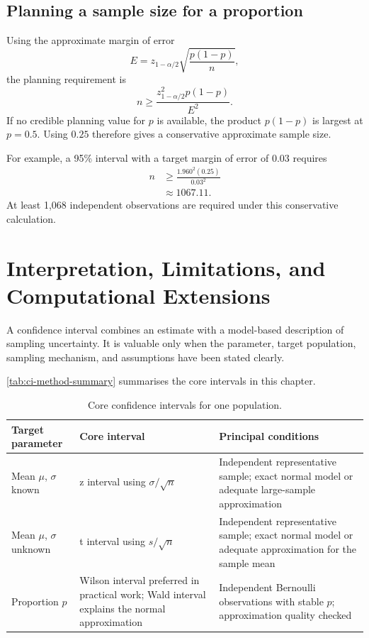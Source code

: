 \subsection{Planning a sample size for a proportion}

Using the approximate margin of error
\[
    E=z_{1-\alpha/2}
      \sqrt{\frac{p(1-p)}{n}},
\]
the planning requirement is
\[
    n\geq
    \frac{z_{1-\alpha/2}^2p(1-p)}{E^2}.
\]
If no credible planning value for $p$ is available, the product $p(1-p)$ is largest at $p=0.5$. Using $0.25$ therefore gives a conservative approximate sample size.

For example, a 95\% interval with a target margin of error of $0.03$ requires
\[
\begin{aligned}
    n
      &\geq
      \frac{1.960^2(0.25)}{0.03^2}\\
      &\approx1067.11.
\end{aligned}
\]
At least 1,068 independent observations are required under this conservative calculation.

\section{Interpretation, Limitations, and Computational Extensions}
\label{sec:ci-interpretation-limitations}

A confidence interval combines an estimate with a model-based description of sampling uncertainty. It is valuable only when the parameter, target population, sampling mechanism, and assumptions have been stated clearly.

\autoref{tab:ci-method-summary} summarises the core intervals in this chapter.

\begin{table}[htbp]
\centering
\caption{Core confidence intervals for one population.}
\label{tab:ci-method-summary}
\begin{tabularx}{\textwidth}{@{}l>{\raggedright\arraybackslash}X>{\raggedright\arraybackslash}X@{}}
\toprule
Target parameter & Core interval & Principal conditions \\
\midrule
Mean $\mu$, $\sigma$ known
& z interval using $\sigma/\sqrt n$
& Independent representative sample; exact normal model or adequate large-sample approximation \\
Mean $\mu$, $\sigma$ unknown
& t interval using $s/\sqrt n$
& Independent representative sample; exact normal model or adequate approximation for the sample mean \\
Proportion $p$
& Wilson interval preferred in practical work; Wald interval explains the normal approximation
& Independent Bernoulli observations with stable $p$; approximation quality checked \\
\bottomrule
\end{tabularx}
\end{table}

